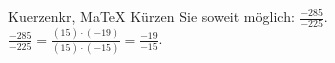 \begin{MAufgabe}{Kuerzen}{kr, MaTeX}
K\"urzen Sie soweit m\"oglich: $\frac{-285}{-225}$.\\ 
\ifLsg\MLoesung
\quad $\frac{-285}{-225}=\frac{(15)\cdot(-19)}{(15)\cdot(-15)}=\frac{-19}{-15}$.\else\relax\fi
 \end{MAufgabe}